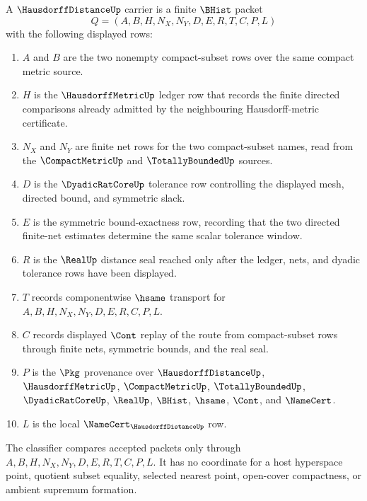 \begin{definition}
\label{def:hausdorff-distance-finite-carrier}
A $\HausdorffDistanceUp$ carrier is a finite $\BHist$ packet
$$
Q=(A,B,H,N_X,N_Y,D,E,R,T,C,P,L)
$$
with the following displayed rows:
\begin{enumerate}
\item $A$ and $B$ are the two nonempty compact-subset rows over the same compact metric source.
\item $H$ is the $\HausdorffMetricUp$ ledger row that records the finite directed comparisons already admitted by the neighbouring Hausdorff-metric certificate.
\item $N_X$ and $N_Y$ are finite net rows for the two compact-subset names, read from the $\CompactMetricUp$ and $\TotallyBoundedUp$ sources.
\item $D$ is the $\DyadicRatCoreUp$ tolerance row controlling the displayed mesh, directed bound, and symmetric slack.
\item $E$ is the symmetric bound-exactness row, recording that the two directed finite-net estimates determine the same scalar tolerance window.
\item $R$ is the $\RealUp$ distance seal reached only after the ledger, nets, and dyadic tolerance rows have been displayed.
\item $T$ records componentwise $\hsame$ transport for $A,B,H,N_X,N_Y,D,E,R,C,P,L$.
\item $C$ records displayed $\Cont$ replay of the route from compact-subset rows through finite nets, symmetric bounds, and the real seal.
\item $P$ is the $\Pkg$ provenance over $\HausdorffDistanceUp$, $\HausdorffMetricUp$, $\CompactMetricUp$, $\TotallyBoundedUp$, $\DyadicRatCoreUp$, $\RealUp$, $\BHist$, $\hsame$, $\Cont$, and $\NameCert$.
\item $L$ is the local $\NameCert_{\HausdorffDistanceUp}$ row.
\end{enumerate}
The classifier compares accepted packets only through $A,B,H,N_X,N_Y,D,E,R,T,C,P,L$. It has no coordinate for a host hyperspace point, quotient subset equality, selected nearest point, open-cover compactness, or ambient supremum formation.
\end{definition}

